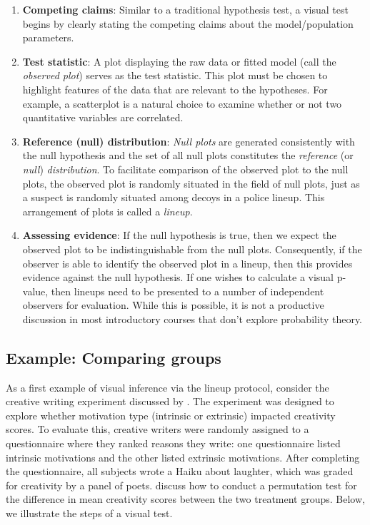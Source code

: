 \documentclass[12pt]{article}
\begin{document}
\begin{enumerate}
\def\labelenumi{\arabic{enumi}.}
\item
  \textbf{Competing claims}: Similar to a traditional hypothesis test, a
  visual test begins by clearly stating the competing claims about the
  model/population parameters.
\item
  \textbf{Test statistic}: A plot displaying the raw data or fitted
  model (call the \emph{observed plot}) serves as the test statistic.
  This plot must be chosen to highlight features of the data that are
  relevant to the hypotheses. For example, a scatterplot is a natural
  choice to examine whether or not two quantitative variables are
  correlated.
\item
  \textbf{Reference (null) distribution}: \emph{Null plots} are
  generated consistently with the null hypothesis and the set of all
  null plots constitutes the \emph{reference} (or \emph{null})
  \emph{distribution}. To facilitate comparison of the observed plot to
  the null plots, the observed plot is randomly situated in the field of
  null plots, just as a suspect is randomly situated among decoys in a
  police lineup. This arrangement of plots is called a \emph{lineup}.
\item
  \textbf{Assessing evidence}: If the null hypothesis is true, then we
  expect the observed plot to be indistinguishable from the null plots.
  Consequently, if the observer is able to identify the observed plot in
  a lineup, then this provides evidence against the null hypothesis. If
  one wishes to calculate a visual p-value, then lineups need to be
  presented to a number of independent observers for evaluation. While
  this is possible, it is not a productive discussion in most
  introductory courses that don't explore probability theory.
\end{enumerate}

\hypertarget{example-comparing-groups}{%
\subsection{Example: Comparing groups}\label{example-comparing-groups}}

As a first example of visual inference via the lineup protocol, consider
the creative writing experiment discussed by \citet{ramsey2013}. The
experiment was designed to explore whether motivation type (intrinsic or
extrinsic) impacted creativity scores. To evaluate this, creative
writers were randomly assigned to a questionnaire where they ranked
reasons they write: one questionnaire listed intrinsic motivations and
the other listed extrinsic motivations. After completing the
questionnaire, all subjects wrote a Haiku about laughter, which was
graded for creativity by a panel of poets. \citet{ramsey2013} discuss
how to conduct a permutation test for the difference in mean creativity
scores between the two treatment groups. Below, we illustrate the steps
of a visual test.
\end{document}
